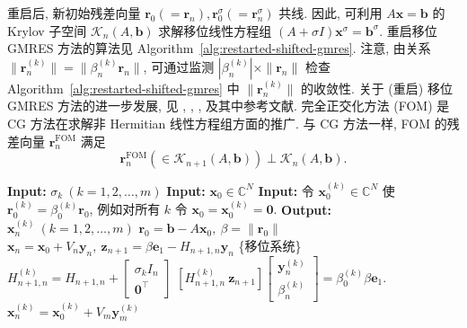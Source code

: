 {重启后, 新初始残差向量 $\bm r_0(=\bm r_n),\bm r_0^{\sigma}(=\bm r_n^{\sigma})$ 共线. 因此, 可利用 $A\bm x=\bm b$ 的 Krylov 子空间 $\mathcal K_n(A,\bm b)$ 求解移位线性方程组 $(A+\sigma I)\bm x^{\sigma}=\bm b^{\sigma}$. 重启移位 GMRES 方法的算法见 Algorithm\ \ref{alg:restarted-shifted-gmres}.}
{注意, 由关系 $\|\bm r_n^{(k)}\|=\|\beta_n^{(k)}\bm r_n\|$, 可通过监测 $|\beta_n^{(k)}|\times\|\bm r_n\|$ 检查 Algorithm\ \ref{alg:restarted-shifted-gmres} 中 $\|\bm r_n^{(k)}\|$ 的收敛性. 关于 (重启) 移位 GMRES 方法的进一步发展, 见 , , ,  及其中参考文献.}
{完全正交化方法 (FOM)  是 CG 方法在求解非 Hermitian 线性方程组方面的推广. 与 CG 方法一样, FOM 的残差向量 $\bm r_n^{\mathrm{FOM}}$ 满足}
\[\bm r_n^{\mathrm{FOM}}(\in\mathcal K_{n+1}(A,\bm b))\perp\mathcal K_n(A,\bm b).\]
\begin{algorithm}[H]\caption{{重启移位 GMRES 方法}}\label{alg:restarted-shifted-gmres}\begin{algorithmic}[1]
\Statex\textbf{Input:} $\sigma_k\ (k=1,2,\ldots,m)$
\Statex\textbf{Input:} $\bm x_0\in\mathbb C^N$
\Statex\textbf{Input:} {令 $\bm x_0^{(k)}\in\mathbb C^N$ 使 $\bm r_0^{(k)}=\beta_0^{(k)}\bm r_0$, 例如对所有 $k$ 令 $\bm x_0=\bm x_0^{(k)}=\bm0$.}
\Statex\textbf{Output:} $\bm x_n^{(k)}\ (k=1,2,\ldots,m)$
\State $\bm r_0=\bm b-A\bm x_0,\ \beta=\|\bm r_0\|$
\State $\bm x_n=\bm x_0+V_n\bm y_n,\ \bm z_{n+1}=\beta\bm e_1-H_{n+1,n}\bm y_n$
\State \{{移位系统}\}
\State $H_{n+1,n}^{(k)}=H_{n+1,n}+\begin{bmatrix}\sigma_k I_n\\\bm0^{\top}\end{bmatrix}$
 $[H_{n+1,n}^{(k)}\ \bm z_{n+1}]\begin{bmatrix}\bm y_n^{(k)}\\\beta_n^{(k)}\end{bmatrix}=\beta_0^{(k)}\beta\bm e_1$.
\State $\bm x_n^{(k)}=\bm x_0^{(k)}+V_m\bm y_m^{(k)}$
\EndFor
{}
\EndIf\end{algorithmic}\end{algorithm}
